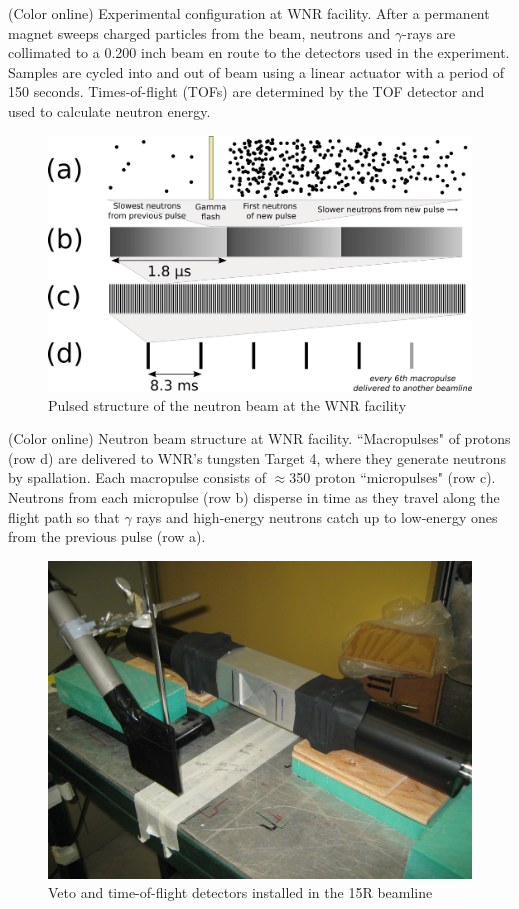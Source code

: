 (Color online) Experimental configuration at WNR facility. After a
        permanent magnet sweeps charged particles from the beam, neutrons and
        $\gamma$-rays are collimated to a 0.200 inch beam en route to the
        detectors used in the experiment. Samples are cycled into and out of beam
        using a linear actuator with a period of 150 seconds. Times-of-flight (TOFs) are
    determined by the TOF detector and used to calculate neutron energy.

\begin{figure}
    \includegraphics[scale=0.4]{figures/beamStructure.png}
    \caption{Pulsed structure of the neutron beam at the WNR facility}
    \label{BeamStructure}
\end{figure}

(Color online) Neutron beam structure at WNR facility.
        ``Macropulses" of protons (row d) are delivered to
        WNR's tungsten Target 4, where they generate neutrons by spallation.
        Each macropulse consists of
        $\approx$350 proton ``micropulses" (row c). Neutrons
        from each micropulse (row b) disperse in
        time as they travel along the flight path so that $\gamma$ rays and high-energy 
    neutrons catch up to low-energy ones from the previous pulse (row a).

\begin{figure}
    \includegraphics[scale=0.2]{figures/VetoAndTOFDetectors.jpg}
    \caption{Veto and time-of-flight detectors installed in the 15R beamline}
    \label{VetoAndTOFDetectors}
\end{figure}

